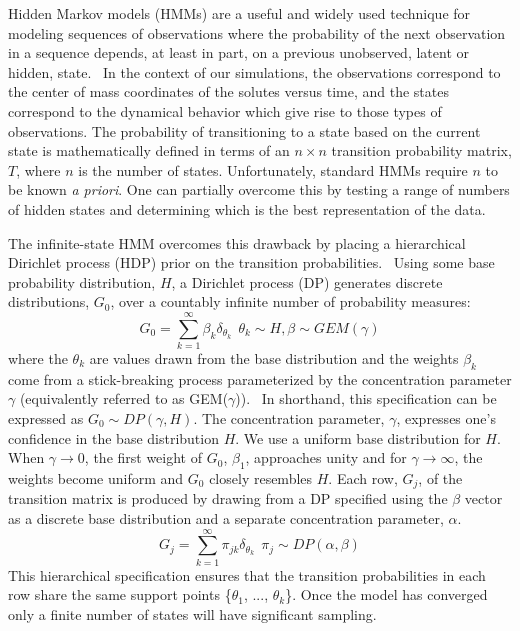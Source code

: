 \documentclass[journal=jpcbfk,manuscript=article]{achemso}
\begin{document}
  Hidden Markov models (HMMs) are a useful and widely used technique for modeling
  sequences of observations where the probability of the next observation in a 
  sequence depends, at least in part, on a previous unobserved, latent or hidden,
  state.~\cite{beal_infinite_2002} In the context of our simulations, the observations
  correspond to the center of mass coordinates of the solutes versus time, and the
  states correspond to the dynamical behavior which give rise to those types
  of observations. The probability of transitioning to a state based on the current
  state is mathematically defined in terms of an $n\times n$ transition probability
  matrix, $T$, where $n$ is the number of states. Unfortunately, standard HMMs 
  require $n$ to be known \textit{a priori}. One can partially overcome this by 
  testing a range of numbers of hidden states and determining which is the best 
  representation of the data.~\cite{pohle_selecting_2017}
  
  The infinite-state HMM overcomes this drawback by placing a hierarchical
  Dirichlet process (HDP) prior on the transition probabilities.~\cite{fox_bayesian_2010} Using some 
  base probability distribution, $H$, a Dirichlet process (DP) generates discrete 
  distributions, $G_0$, over a countably infinite number of probability measures:
  \begin{equation}
      G_0 = \sum_{k=1}^{\infty} \beta_k \delta_{\theta_k} ~~ \theta_k \sim H, \beta \sim GEM(\gamma)
  \end{equation}
  where the $\theta_k$ are values drawn from the base distribution and the weights
  $\beta_k$ come from a stick-breaking process parameterized by the concentration 
  parameter $\gamma$ (equivalently referred to as GEM($\gamma$)).~\cite{halmos_random_1944} In shorthand, this
  specification can be expressed as $G_0 \sim DP(\gamma, H)$. The concentration 
  parameter, $\gamma$, expresses one's confidence in the base distribution $H$.
  We use a uniform base distribution for $H$. When $\gamma\to 0$, the first 
  weight of $G_0$, $\beta_1$, approaches unity and for $\gamma\to\infty$, the weights
  become uniform and $G_0$ closely resembles $H$. Each row, $G_j$, of the transition 
  matrix is produced by drawing from a DP specified using the $\beta$ vector as a 
  discrete base distribution and a separate concentration parameter, $\alpha$.
  \begin{equation}
      G_j = \sum_{k=1}^{\infty} \pi_{jk} \delta_{\theta_k} ~~ \pi_j \sim DP(\alpha, \beta)
  \end{equation}
  This hierarchical specification ensures that the transition probabilities in 
  each row share the same support points \{$\theta_1$, ..., $\theta_k$\}.
  Once the model has converged only a finite number of states will have significant
  sampling.
  
\end{document}
